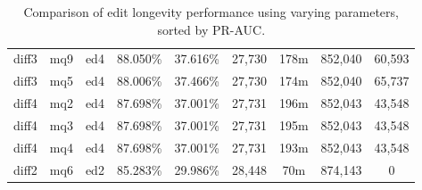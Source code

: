 \begin{sidewaystable}[!tp]
\begin{center}
\begin{tabular}{|c|c|c||c|c||c|c|c|c|}
diff3 & mq9 & ed4 & 88.050\% & 37.616\% & 27,730 & 178m & 852,040 & 60,593 \\
diff3 & mq5 & ed4 & 88.006\% & 37.466\% & 27,730 & 174m & 852,040 & 65,737 \\
diff4 & mq2 & ed4 & 87.698\% & 37.001\% & 27,731 & 196m & 852,043 & 43,548 \\
diff4 & mq3 & ed4 & 87.698\% & 37.001\% & 27,731 & 195m & 852,043 & 43,548 \\
diff4 & mq4 & ed4 & 87.698\% & 37.001\% & 27,731 & 193m & 852,043 & 43,548 \\
diff2 & mq6 & ed2 & 85.283\% & 29.986\% & 28,448 & 70m & 874,143 & 0 \\
\hline
\end{tabular}
\end{center}
\caption{Comparison of edit longevity performance using
    varying parameters, sorted by PR-AUC.}
\label{tab:editshout}
\end{sidewaystable}

